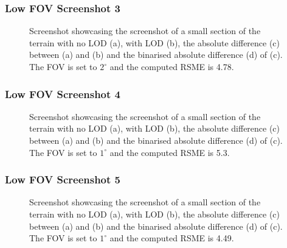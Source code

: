 \subsubsection{Low FOV Screenshot 3}
\begin{figure}[H]
  \centering
  \qquad
  \qquad
  \qquad
  \caption{Screenshot showcasing the screenshot of a small section of the terrain with no LOD (a), with LOD (b),
  the absolute difference (c) between (a) and (b) and the binarised absolute difference (d) of (c). The FOV is set to $2^{\circ}$ and the computed RSME is 4.78.}\label{fig:results-zoom-3}
\end{figure}

\subsubsection{Low FOV Screenshot 4}
\begin{figure}[H]
  \centering
  \qquad
  \qquad
  \qquad
  \caption{Screenshot showcasing the screenshot of a small section of the terrain with no LOD (a), with LOD (b),
  the absolute difference (c) between (a) and (b) and the binarised absolute difference (d) of (c). The FOV is set to $1^{\circ}$ and the computed RSME is 5.3.}\label{fig:results-zoom-4}
\end{figure}
\subsubsection{Low FOV Screenshot 5}
\begin{figure}[H]
  \centering
  \qquad
  \qquad
  \qquad
  \caption{Screenshot showcasing the screenshot of a small section of the terrain with no LOD (a), with LOD (b),
  the absolute difference (c) between (a) and (b) and the binarised absolute difference (d) of (c). The FOV is set to $1^{\circ}$ and the computed RSME is 4.49.}\label{fig:results-zoom-5}
\end{figure}
